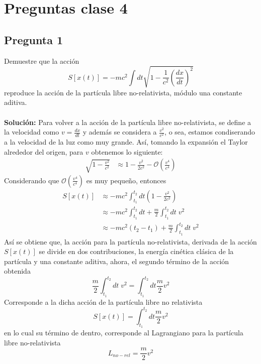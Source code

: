\documentclass[../main_ej.tex]{subfiles}
\begin{document}
\section{Preguntas clase 4}

\subsection*{Pregunta 1}
Demuestre que la acción 
\begin{equation}
  S[x(t)]=-mc^2\int dt \sqrt{1-\frac{1}{c^2}\left( \frac{dx}{dt}\right)^2}
\end{equation}
reproduce la acción de la partícula libre no-relativista, módulo una constante aditiva. \\
\\

\textbf{Solución:}
Para volver a la acción de la partícula libre no-relativista, se define a la velocidad como $v=\frac{dx}{dt}$ y además se considera a $\frac{v^2}{c^2}$, o sea, estamos condiserando a la velocidad de la luz como muy grande. Así, tomando la expansión el Taylor alrededor del origen, para $v$ obtenemos lo siguiente:
\begin{align*} 
  \sqrt{1-\frac{v^2}{c^2}} & \approx 1 - \frac{v^2}{2c^2} - \mathcal{O}\left( \frac{v^4}{c^4}
  \right)
\end{align*}
Considerando que $\mathcal{O}\left( \frac{v^4}{c^4}\right)$ es muy pequeño, entonces 
\begin{align*}
  S[x(t)] & \approx -mc^2\int_{t_1}^{t_2} dt\left(1-\frac{v^2}{2c^2}  \right) \\
  & \approx -mc^2\int_{t_1}^{t_2} dt + \frac{m}{2}\int_{t_1}^{t_2}dt\; v^2 \\
  & \approx -mc^2(t_2-t_1) + \frac{m}{2}\int_{t_1}^{t_2}dt \; v^2
\end{align*}
Así se obtiene que, la acción para la partícula no-relativista, derivada de la acción $S[x(t)]$ se divide en dos contribuciones, la energía cinética clásica de la partícula y una constante aditiva, ahora, el segundo término de la acción obtenida
\begin{equation}
  \frac{m}{2}\int_{t_1}^{t_2}dt \; v^2 = \int_{t_1}^{t_2}dt\frac{m}{2}v^2
\end{equation}
Corresponde a la dicha acción de la partícula libre no relativista
\begin{equation}
  S[x(t)]=\int_{t_1}^{t_2}dt\frac{m}{2}v^2
\end{equation}
en lo cual su término de dentro, corresponde al Lagrangiano para la partícula libre no-relativista
\begin{equation}
  L_{no-rel} = \frac{m}{2}v^2
\end{equation}
\\
\end{document}
